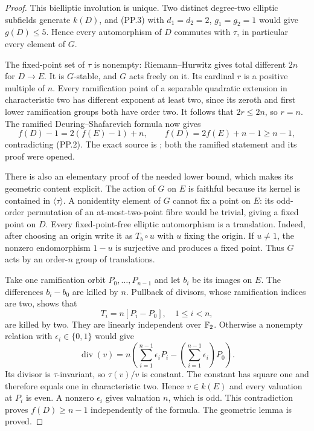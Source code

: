 \begin{proof}
This bielliptic involution is unique. Two distinct
degree-two elliptic subfields generate $k(D)$, and
(PP.3) with $d_1=d_2=2$, $g_1=g_2=1$ would give
$g(D)\le5$. Hence every automorphism of $D$ commutes
with $\tau$, in particular every element of $G$.

The fixed-point set of $\tau$ is nonempty:
Riemann--Hurwitz gives total different $2n$ for
$D\to E$. It is $G$-stable, and $G$ acts freely on it.
Its cardinal $r$ is a positive multiple of $n$.
Every ramification point of a separable quadratic
extension in characteristic two has different exponent
at least two, since its zeroth and first lower
ramification groups both have order two.
It follows that $2r\le2n$, so $r=n$.
The ramified Deuring--Shafarevich formula now gives
\[
 f(D)-1=2(f(E)-1)+n,\qquad
                   f(D)=2f(E)+n-1\ge n-1,                 \tag{PP.4}
\]
contradicting (PP.2). The exact source is
\citet[Corollary 1.8, pp.~35--36]{A_PrimCrew1984};
both the ramified statement and its proof were opened.

There is also an elementary proof of the needed lower
bound, which makes its geometric content explicit.
The action of $G$ on $E$ is faithful because its
kernel is contained in $\langle\tau\rangle$.
A nonidentity element of $G$ cannot fix a point on
$E$: its odd-order permutation of an at-most-two-point
fibre would be trivial, giving a fixed point on $D$.
Every fixed-point-free elliptic automorphism is a
translation. Indeed, after choosing an origin write
it as $T_b\circ u$ with $u$ fixing the origin. If
$u\ne1$, the nonzero endomorphism $1-u$ is surjective
and produces a fixed point. Thus $G$ acts by an
order-$n$ group of translations.

Take one ramification orbit $P_0,\ldots,P_{n-1}$
and let $b_i$ be its images on $E$.
The differences $b_i-b_0$ are killed by $n$.
Pullback of divisors, whose ramification indices are
two, shows that
\[
                       T_i=n[P_i-P_0],\quad 1\le i<n,
\]
are killed by two. They are linearly independent over
$\mathbb F_2$. Otherwise a nonempty relation with
$\epsilon_i\in\{0,1\}$ would give
\[
 \operatorname{div}(v)=
 n\left(\sum_{i=1}^{n-1}\epsilon_iP_i
       -\left(\sum_{i=1}^{n-1}\epsilon_i\right)P_0\right).
\]
Its divisor is $\tau$-invariant, so $\tau(v)/v$ is
constant. The constant has square one and therefore
equals one in characteristic two. Hence $v\in k(E)$
and every valuation at $P_i$ is even. A nonzero
$\epsilon_i$ gives valuation $n$, which is odd.
This contradiction proves $f(D)\ge n-1$
independently of the formula. The geometric lemma is
proved.


\end{proof}
